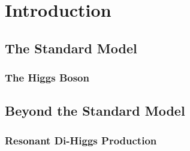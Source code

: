 \chapter{Introduction}

\section{The Standard Model}
\subsection{The Higgs Boson}
\section{Beyond the Standard Model}
\subsection{Resonant Di-Higgs Production}




